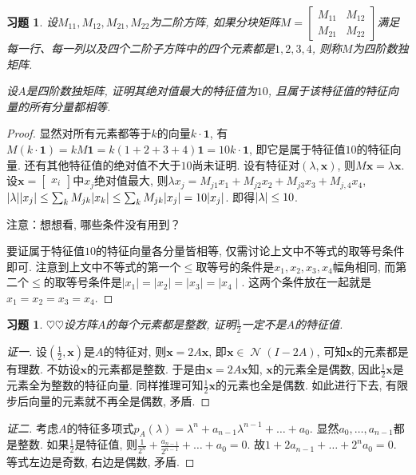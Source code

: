 \documentclass{ctexart}
\newtheorem{exercise}[thm]{习题}
\newcommand\bs[1]{\boldsymbol{ #1}}
\newcommand\hint[1]{\par {\footnotesize\kaishu 提示：#1}}
\newcommand\note[1]{\par {\footnotesize\kaishu 注意：#1}}
\def\hard{$\heartsuit$}
\DeclareMathOperator{\nullspace}{\mathcal{N}}
\DeclarePairedDelimiter\abs{|}{|}
\begin{document}
\begin{exercise}
设$M_{11},M_{12},M_{21},M_{22}$为二阶方阵, 如果分块矩阵$M=\begin{bmatrix}M_{11}&M_{12}\\M_{21}&M_{22}\end{bmatrix}$满足每一行、每一列以及四个二阶子方阵中的四个元素都是$1,2,3,4$, 则称$M$为四阶数独矩阵. 

设$A$是四阶数独矩阵, 证明其绝对值最大的特征值为$10$, 且属于该特征值的特征向量的所有分量都相等. 
\end{exercise}
\begin{proof}
	显然对所有元素都等于$k$的向量$k\cdot\bs 1$, 有$M(k\cdot \bs 1)=kM\bs 1=k(1+2+3+4)\bs 1=10k\cdot \bs 1$, 即它是属于特征值$10$的特征向量. 
	还有其他特征值的绝对值不大于$10$尚未证明. 
	设有特征对$(\lambda,\bs x)$, 则$M\bs x=\lambda \bs x$. 
	设$\bs x=\begin{bmatrix}
		x_i
	\end{bmatrix}$中$x_j$绝对值最大, 则$\lambda x_j=M_{j1}x_1+M_{j2}x_2+M_{j3}x_3+M_{j,4}x_4$, 
	$\abs{\lambda}\abs{x_j}
	\le \sum_{k}M_{jk}\abs{x_k}
	\le  \sum_{k}M_{jk}\abs{x_j}
	=10\abs{x_j}$. 即得$\abs{\lambda}\le 10$. 

	\note{想想看, 哪些条件没有用到？}

    要证属于特征值$10$的特征向量各分量皆相等, 仅需讨论上文中不等式的取等号条件即可. 注意到上文中不等式的第一个$\leq$取等号的条件是$x_1,x_2,x_3,x_4$幅角相同, 而第二个$\leq$的取等号条件是$\mid x_1\mid=\mid x_2\mid=\mid x_3\mid=\mid x_4\mid$. 这两个条件放在一起就是$x_1=x_2=x_3=x_4$.
\end{proof}

\begin{exercise}
\hard\hard 设方阵$A$的每个元素都是整数, 证明$\frac{1}{2}$一定不是$A$的特征值. 

\end{exercise}
\begin{proof}[证一]
	设$(\frac{1}{2},\bs x)$是$A$的特征对, 则$\bs x=2A\bs x$, 即$\bs x\in\nullspace(I-2A)$, 可知$\bs x$的元素都是有理数. 
	不妨设$\bs x$的元素都是整数. 
	于是由$\bs x=2A\bs x$知, $\bs x$的元素全是偶数, 因此$\frac{1}{2}\bs x$是元素全为整数的特征向量. 
	同样推理可知$\frac{1}{2}\bs x$的元素也全是偶数. 
	如此进行下去, 有限步后向量的元素就不再全是偶数, 矛盾. 
\end{proof}
\begin{proof}[证二]
	考虑$A$的特征多项式$p_A(\lambda)=\lambda^n+a_{n-1}\lambda^{n-1}+\dots+a_0$. 显然$a_0,\dots,a_{n-1}$都是整数. 
	如果$\frac{1}{2}$是特征值, 则$\frac{1}{2^n}+\frac{a_{n-1}}{2^{n-1}}+\dots+a_0=0$. 
	故$1+2a_{n-1}+\dots+2^na_0=0$. 
	等式左边是奇数, 右边是偶数, 矛盾. 
\end{proof}
\end{document}
